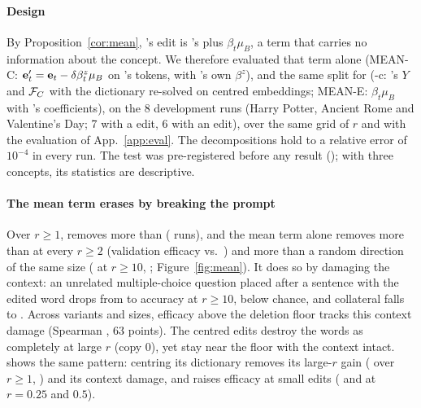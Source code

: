 \paragraph{Design}
By Proposition~\ref{cor:mean}, \cinderz{}'s edit is \cinder{}'s plus $\beta_t\mu_B$, a term that carries no information about the concept.
We therefore evaluated that term alone (MEAN-C: $\mathbf{e}_t' = \mathbf{e}_t - \delta\beta^z_t\mu_B$ on \cinder{}'s tokens, with \cinderz{}'s own $\beta^z$), and the same split for \ember{} (\ember{}-c: \ember{}'s $Y$ and $\mathcal{F}_C$ with the dictionary re-solved on centred embeddings; MEAN-E: $\beta_t\mu_B$ with \ember{}'s coefficients), on the 8 development runs (Harry Potter, Ancient Rome and Valentine's Day; 7 with a \cinder{} edit, 6 with an \ember{} edit), over the same grid of $r$ and with the evaluation of App.~\ref{app:eval}.
The decompositions hold to a relative error of $10^{-4}$ in every run.
The test was pre-registered before any result (); with three concepts, its statistics are descriptive.

\paragraph{The mean term erases by breaking the prompt}
Over $r \geq 1$, \cinderz{} removes  more than \cinder{} ( runs), and the mean term alone removes more than \cinderz{} at every $r \geq 2$ (validation efficacy  vs.\ ) and more than a random direction of the same size ( at $r \geq 10$, ; Figure~\ref{fig:mean}).
It does so by damaging the context: an unrelated multiple-choice question placed after a sentence with the edited word drops from  to  accuracy at $r \geq 10$, below chance, and collateral falls to .
Across variants and sizes, efficacy above the deletion floor tracks this context damage (Spearman , 63 points).
The centred edits destroy the words as completely at large $r$ (copy 0), yet stay near the floor with the context intact.
\ember{} shows the same pattern: centring its dictionary removes its large-$r$ gain ( over $r \geq 1$, ) and its context damage, and raises efficacy at small edits ( and  at $r = 0.25$ and $0.5$).

